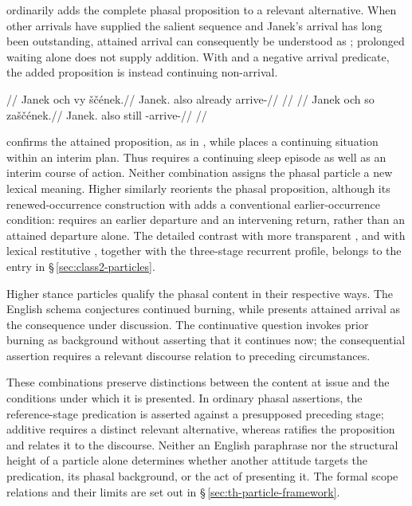  ordinarily adds the complete phasal proposition to a relevant
alternative. When other arrivals have supplied the salient sequence and
Janek's arrival has long been outstanding, attained arrival can consequently
be understood as ; prolonged waiting alone does not supply
addition. With  and a negative arrival predicate, the added
proposition is instead continuing non-arrival.

\pex
\a
\begingl
\glpreamble {}//
\gla Janek och vy ščének.//
\glb Janek.\Dir{} also already arrive-\Pf{}//
\glft {}//
\endgl
\a
\begingl
\glpreamble {}//
\gla Janek och so zaščének.//
\glb Janek.\Dir{} also still \Neg{}-arrive-\Pf{}//
\glft {}//
\endgl
\xe

 confirms the attained proposition, as in  , while  places a
continuing situation within an interim plan. Thus 
 requires a continuing sleep episode as
well as an interim course of action. Neither combination assigns the phasal
particle a new lexical meaning. Higher  similarly reorients the
phasal proposition, although its renewed-occurrence construction with
 adds a conventional earlier-occurrence condition:
 requires an earlier departure and an intervening
return, rather than an attained departure alone. The detailed contrast with
more transparent , and with lexical restitutive
, together with the three-stage recurrent profile, belongs to the  entry in
§\,\ref{sec:class2-particles}.

Higher stance particles qualify the phasal content in their respective
ways. The English schema 
conjectures continued burning, while 
 presents attained arrival as the
consequence under discussion. The continuative question invokes prior burning as background without
asserting that it continues now; the consequential assertion requires a
relevant discourse relation to preceding circumstances.

These combinations preserve distinctions between the content at issue and
the conditions under which it is presented. In ordinary phasal assertions,
the reference-stage predication is asserted against a presupposed preceding
stage; additive  requires a distinct relevant alternative, whereas
 ratifies the proposition and  relates it to the
discourse. Neither an English paraphrase nor the structural height of a
particle alone determines whether another attitude targets the predication,
its phasal background, or the act of presenting it. The formal scope
relations and their limits are set out in
§\,\ref{sec:th-particle-framework}.

